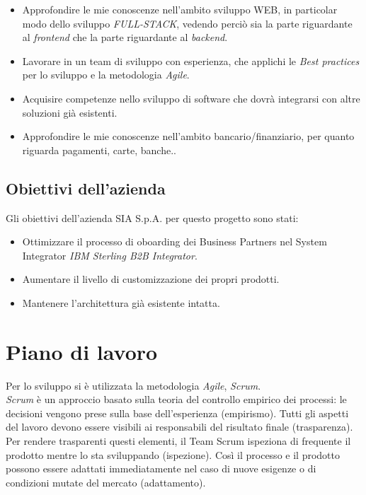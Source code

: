 \begin{itemize}
    \item Approfondire le mie conoscenze nell'ambito sviluppo WEB, in particolar modo 
    dello sviluppo \textit{FULL-STACK}, vedendo perciò sia la parte riguardante al \textit{frontend} che la parte riguardante al \textit{backend}.
    
    \item Lavorare in un team di sviluppo con esperienza, che applichi le \textit{Best practices} per lo sviluppo e la metodologia \textit{Agile}.
    
    \item Acquisire competenze nello sviluppo di software che dovrà integrarsi con altre soluzioni già esistenti.
    
    \item Approfondire le mie conoscenze nell'ambito bancario/finanziario, per quanto riguarda pagamenti, carte, banche..
\end{itemize}

\subsection{Obiettivi dell'azienda}
\label{subsec:obiettiviazienda}
Gli obiettivi dell'azienda SIA S.p.A. per questo progetto sono stati:

\begin{itemize}
    \item Ottimizzare il processo di oboarding dei Business Partners nel System Integrator \textit{IBM Sterling B2B Integrator}.
    \item Aumentare il livello di customizzazione dei propri prodotti.
    \item Mantenere l'architettura già esistente intatta.
\end{itemize}



\section{Piano di lavoro}
\label{sec:pianodilavoro}

Per lo sviluppo si è utilizzata la metodologia \textit{Agile}, \textit{Scrum}. \\
\textit{Scrum} è un approccio basato sulla teoria del controllo empirico dei processi: le decisioni vengono prese sulla base dell’esperienza (empirismo).
Tutti gli aspetti del lavoro devono essere visibili ai responsabili del risultato finale (trasparenza). Per rendere trasparenti questi elementi, il Team Scrum ispeziona di frequente il prodotto mentre lo sta sviluppando (ispezione). Così il processo e il prodotto possono essere adattati immediatamente nel caso di nuove esigenze o di condizioni mutate del mercato (adattamento). \cite{scruminfo}




